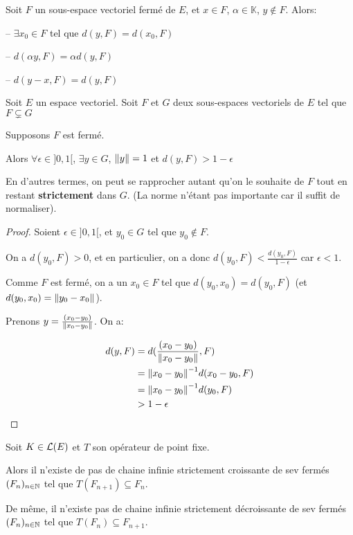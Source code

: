 \begin{exercice}
	Soit $F$ un sous-espace vectoriel fermé de $E$, et $x \in F$, $\alpha \in
	\mathbb{K}$, $y \notin F$. Alors:

	-- $\exists x_{0} \in F$ tel que $d(y, F) = d(x_{0}, F)$

	-- $d(\alpha y, F) = \alpha d(y, F)$

	-- $d(y - x, F) = d(y, F)$
\end{exercice}

\begin{proposition}
	Soit $E$ un espace vectoriel. Soit $F$ et $G$ deux sous-espaces vectoriels
	de $E$ tel que $F \subsetneq G$

	Supposons $F$ est fermé.

	Alors $\forall \epsilon \in ]0, 1[$, $\exists y \in G$, $\norm{y} = 1$ et
	$d(y, F) > 1 - \epsilon$

	En d'autres termes, on peut se rapprocher autant qu'on le souhaite de $F$
	tout en restant \textbf{strictement} dans $G$. (La norme n'étant pas
	importante car il suffit de normaliser).
\end{proposition}

\begin{proof}
	Soient $\epsilon \in ]0, 1[$, et $y_{0} \in G$ tel que $y_{0} \notin F$.

	On a $d(y_{0}, F) > 0$, et en particulier, on a donc $d(y_{0}, F) <
	\frac{d(y_{0},F)}{1 - \epsilon}$ car $\epsilon < 1$.

	Comme $F$ est fermé, on a un $x_{0} \in F$ tel que $d(y_{0}, x_{0}) =
	d(y_{0}, F)$ (et $d(y_{0}, x_{0}) = \norm{y_{0} - x_{0}}$).

	Prenons $y = \frac{(x_{0} - y_{0})}{\norm{x_{0} - y_{0}}}$. On a:

	\begin{align}
		d(y, F) &= d(\frac{(x_{0} - y_{0})}{\norm{x_{0} - y_{0}}}, F) \\
		&= \norm{x_{0} - y_{0}}^{-1} d(x_{0} - y_{0}, F) \\
		&= \norm{x_{0} - y_{0}}^{-1} d(y_{0}, F) \\
		&> 1 - \epsilon
	\end{align}
\end{proof}

\begin{proposition}
	Soit $K \in \mathcal{L}(E)$ et $T$ son opérateur de point fixe.

	Alors il n'existe de pas de chaine infinie strictement croissante de sev
	fermés $(F_{n})_{n \in \mathbb{N}}$ tel que $T(F_{n + 1}) \subseteq
	F_{n}$.

	De même, il n'existe pas de chaine infinie strictement décroissante de
	sev fermés $(F_{n})_{n \in \mathbb{N}}$ tel que $T(F_{n}) \subseteq F_{n +
	1}$.
\end{proposition}

